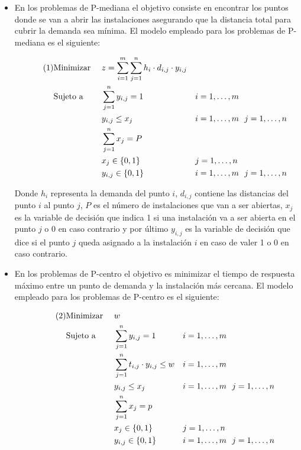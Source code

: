 \documentclass[a4paper,11pt]{article}
\newcommand\numberthis{				%
	\addtocounter{equation}{1}\tag{\theequation}
}
\begin{document}
\begin{itemize}
\item En los problemas de P-mediana el objetivo consiste en encontrar los puntos donde se van a abrir las instalaciones asegurando que la distancia total para cubrir la demanda sea mínima. El modelo empleado para los problemas de P-mediana es el siguiente:

\begin{align*}\numberthis
   	&\textrm{Minimizar }	&& z = \sum_{i=1}^{m}{\sum_{j=1}^{n}{h_i \cdot d_{i,j} \cdot y_{i,j}}}	&& \\
   	&\textrm{Sujeto a }		&& \sum_{j=1}^{n}{y_{i,j}} = 1 					&& i=1,\ldots,m \\
    &						&& y_{i,j} \leq x_j								&& i=1,\ldots,m \ \ j=1,\ldots,n \\
    &						&& \sum_{j=1}^{n}{x_j} = P						&&				\\
	&						&& x_{j} \in \{0,1\}							&& j=1,\ldots,n \\
	&						&& y_{i,j} \in \{0,1\}							&& i=1,\ldots,m \ \ j=1,\ldots,n
\end{align*}

Donde ${h_i}$ representa la demanda del punto ${i}$, ${d_{i,j}}$ contiene las distancias del punto ${i}$ al punto ${j}$, ${P}$ es el número de instalaciones que van a ser abiertas, ${x_j}$ es la variable de decisión que indica 1 si una instalación va a ser abierta en el punto ${j}$ o 0 en caso contrario y por último ${y_{i,j}}$ es la variable de decisión que dice si el punto ${j}$ queda asignado a la instalación ${i}$ en caso de valer 1 o 0 en caso contrario.

\item En los problemas de P-centro el objetivo es minimizar el tiempo de respuesta máximo entre un punto de demanda y la instalación más cercana. El modelo empleado para los problemas de P-centro es el siguiente:

\begin{align*}\numberthis
   	&\textrm{Minimizar }	&& w											&&				\\
   	&\textrm{Sujeto a }		&& \sum_{j=1}^{n}{y_{i,j}} = 1					&& i=1,\ldots,m \\
    &						&& \sum_{j=1}^{n}{t_{i,j} \cdot y_{i,j}} \leq w 	&& i=1,\ldots,m \\
    &						&& y_{i,j} \leq x_j								&& i=1,\ldots,m \ \ j=1,\ldots,n \\
    &						&& \sum_{j=1}^{n}{x_j} = p						&&				\\
	&						&& x_{j} \in \{0,1\}							&& j=1,\ldots,n \\
	&						&& y_{i,j} \in \{0,1\}							&& i=1,\ldots,m \ \ j=1,\ldots,n
\end{align*}


\end{itemize}
\end{document}
